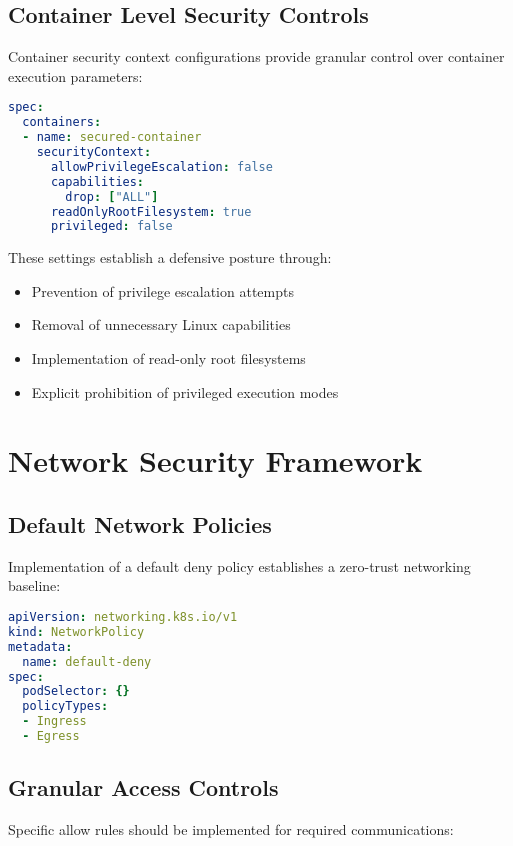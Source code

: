 \documentclass[PMO,lsstdraft,authoryear,toc]{lsstdoc}
\begin{document}
\subsection{Container Level Security Controls}

Container security context configurations provide granular control over container execution parameters:

\begin{lstlisting}[language=yaml]
spec:
  containers:
  - name: secured-container
    securityContext:
      allowPrivilegeEscalation: false
      capabilities:
        drop: ["ALL"]
      readOnlyRootFilesystem: true
      privileged: false
\end{lstlisting}

These settings establish a defensive posture through:

\begin{itemize}
    \item Prevention of privilege escalation attempts
    \item Removal of unnecessary Linux capabilities
    \item Implementation of read-only root filesystems
    \item Explicit prohibition of privileged execution modes
\end{itemize}

\section{Network Security Framework}

\subsection{Default Network Policies}

Implementation of a default deny policy establishes a zero-trust networking baseline:

\begin{lstlisting}[language=yaml]
apiVersion: networking.k8s.io/v1
kind: NetworkPolicy
metadata:
  name: default-deny
spec:
  podSelector: {}
  policyTypes:
  - Ingress
  - Egress
\end{lstlisting}

\subsection{Granular Access Controls}

Specific allow rules should be implemented for required communications:
\end{document}
